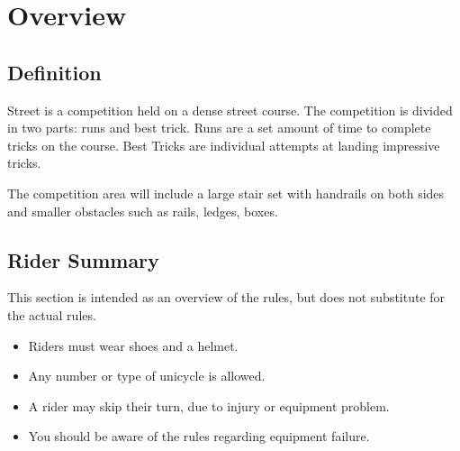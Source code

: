 \chapter{Overview}

\section{Definition}

Street is a competition held on a dense street course.
The competition is divided in two parts: runs and best trick.
Runs are a set amount of time to complete tricks on the course.
Best Tricks are individual attempts at landing impressive tricks.

The competition area will include a large stair set with handrails on both sides and smaller obstacles such as rails, ledges, boxes.

\section{Rider Summary}

This section is intended as an overview of the rules, but does not substitute for the actual rules.
\begin{itemize}
\item Riders must wear shoes and a helmet.
\item Any number or type of unicycle is allowed.
\item A rider may skip their turn, due to injury or equipment problem.
\item You should be aware of the rules regarding equipment failure.
\end{itemize}
